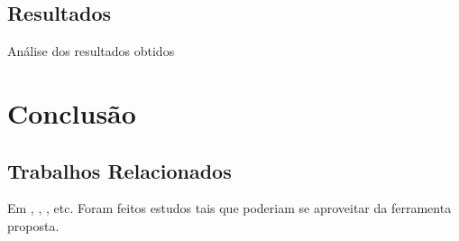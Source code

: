 \documentclass[a4paper,12pt]{article}
\begin{document}
\subsection{Resultados}%
\label{sec:resultados}
Análise dos resultados obtidos

\newpage

\section{Conclusão}%


\subsection{Trabalhos Relacionados}%
Em \cite{Calciati}, \cite{WhoAdded}, \cite{YLyu}, etc. Foram feitos estudos tais que poderiam se aproveitar da ferramenta proposta.





\newpage
%


\nocite{developer}
\end{document}
